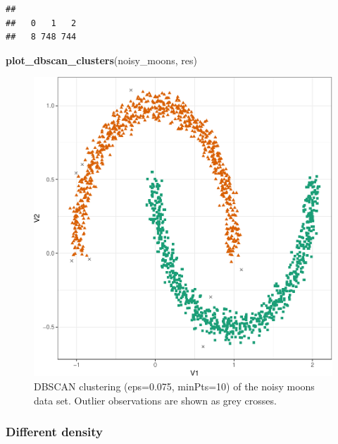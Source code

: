 \documentclass[]{book}
\newenvironment{Shaded}{\begin{snugshade}}{\end{snugshade}}
\newcommand{\KeywordTok}[1]{\textcolor[rgb]{0.13,0.29,0.53}{\textbf{{#1}}}}
\newcommand{\DataTypeTok}[1]{\textcolor[rgb]{0.13,0.29,0.53}{{#1}}}
\newcommand{\DecValTok}[1]{\textcolor[rgb]{0.00,0.00,0.81}{{#1}}}
\newcommand{\FloatTok}[1]{\textcolor[rgb]{0.00,0.00,0.81}{{#1}}}
\newcommand{\StringTok}[1]{\textcolor[rgb]{0.31,0.60,0.02}{{#1}}}
\newcommand{\NormalTok}[1]{{#1}}
\theoremstyle{definition}
\theoremstyle{definition}
\theoremstyle{definition}
\theoremstyle{remark}
\begin{document}
\begin{Shaded}
\end{Shaded}

\begin{verbatim}
## 
##   0   1   2 
##   8 748 744
\end{verbatim}

\begin{Shaded}
\begin{Highlighting}[]
\KeywordTok{plot_dbscan_clusters}\NormalTok{(noisy_moons, res)}
\end{Highlighting}
\end{Shaded}

\begin{figure}

{\centering \includegraphics[width=0.6\linewidth]{09-clustering_files/figure-latex/noisyMoonsDBSCANscatter-1} 

}

\caption{DBSCAN clustering (eps=0.075, minPts=10) of the noisy moons data set. Outlier observations are shown as grey crosses.}\label{fig:noisyMoonsDBSCANscatter}
\end{figure}

\subsubsection{Different density}\label{different-density-1}
\end{document}
